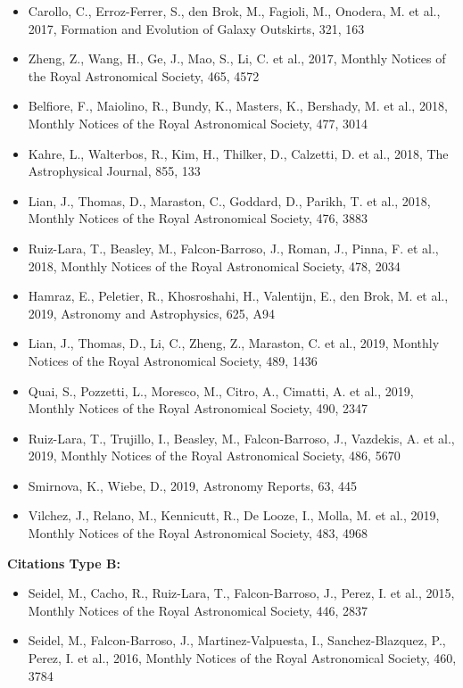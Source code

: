 \documentclass{letter}
\begin{document}
\begin{enumerate}
\begin{itemize}
\item Carollo, C., Erroz-Ferrer, S., den Brok, M., Fagioli, M., Onodera, M. et al., 2017, Formation and Evolution of Galaxy Outskirts, 321, 163
\item Zheng, Z., Wang, H., Ge, J., Mao, S., Li, C. et al., 2017, Monthly Notices of the Royal Astronomical Society, 465, 4572
\item Belfiore, F., Maiolino, R., Bundy, K., Masters, K., Bershady, M. et al., 2018, Monthly Notices of the Royal Astronomical Society, 477, 3014
\item Kahre, L., Walterbos, R., Kim, H., Thilker, D., Calzetti, D. et al., 2018, The Astrophysical Journal, 855, 133
\item Lian, J., Thomas, D., Maraston, C., Goddard, D., Parikh, T. et al., 2018, Monthly Notices of the Royal Astronomical Society, 476, 3883
\item Ruiz-Lara, T., Beasley, M., Falcon-Barroso, J., Roman, J., Pinna, F. et al., 2018, Monthly Notices of the Royal Astronomical Society, 478, 2034
\item Hamraz, E., Peletier, R., Khosroshahi, H., Valentijn, E., den Brok, M. et al., 2019, Astronomy and Astrophysics, 625, A94
\item Lian, J., Thomas, D., Li, C., Zheng, Z., Maraston, C. et al., 2019, Monthly Notices of the Royal Astronomical Society, 489, 1436
\item Quai, S., Pozzetti, L., Moresco, M., Citro, A., Cimatti, A. et al., 2019, Monthly Notices of the Royal Astronomical Society, 490, 2347
\item Ruiz-Lara, T., Trujillo, I., Beasley, M., Falcon-Barroso, J., Vazdekis, A. et al., 2019, Monthly Notices of the Royal Astronomical Society, 486, 5670
\item Smirnova, K., Wiebe, D., 2019, Astronomy Reports, 63, 445
\item Vilchez, J., Relano, M., Kennicutt, R., De Looze, I., Molla, M. et al., 2019, Monthly Notices of the Royal Astronomical Society, 483, 4968
\end{itemize}
{\bf Citations Type B:}
\begin{itemize}
\item Seidel, M., Cacho, R., Ruiz-Lara, T., Falcon-Barroso, J., Perez, I. et al., 2015, Monthly Notices of the Royal Astronomical Society, 446, 2837
\item Seidel, M., Falcon-Barroso, J., Martinez-Valpuesta, I., Sanchez-Blazquez, P., Perez, I. et al., 2016, Monthly Notices of the Royal Astronomical Society, 460, 3784

\end{itemize}
\end{enumerate}
\end{document}
